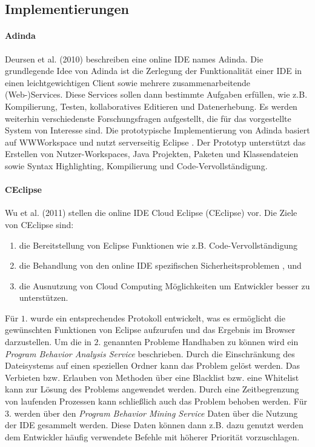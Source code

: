 \subsection{Implementierungen}\label{section:stand-der-technik:literaturrecherche:implementierungen}

\paragraph{Adinda}
Deursen et al. (2010) \cite{van_deursen_adinda_2010} beschreiben eine online IDE names Adinda. Die grundlegende Idee von Adinda ist die Zerlegung der Funktionalität einer IDE in einen leichtgewichtigen Client sowie mehrere zusammenarbeitende (Web-)Services. Diese Services sollen dann bestimmte Aufgaben erfüllen, wie z.B. Kompilierung, Testen, kollaboratives Editieren und Datenerhebung. Es werden weiterhin verschiedenste Forschungsfragen aufgestellt, die für das vorgestellte System von Interesse sind. Die prototypische Implementierung von Adinda basiert auf WWWorkspace \cite{ryan_web_2007} und nutzt serverseitig Eclipse \cite{noauthor_eclipse_nodate}. Der Prototyp unterstützt das Erstellen von Nutzer-Workspaces, Java Projekten, Paketen und Klassendateien sowie Syntax Highlighting, Kompilierung und Code-Vervollständigung. 

\paragraph{CEclipse}
Wu et al. (2011) \cite{wu_ceclipse_2011} stellen die online IDE Cloud Eclipse (CEclipse) vor. Die Ziele von CEclipse sind:
\begin{enumerate}
    \item die Bereitstellung von Eclipse \cite{noauthor_eclipse_nodate} Funktionen wie z.B. Code-Vervollständigung
    \item die Behandlung von den online IDE spezifischen Sicherheitsproblemen ,  und 
    \item die Ausnutzung von Cloud Computing Möglichkeiten um Entwickler besser zu unterstützen.
\end{enumerate}
Für $1.$ wurde ein entsprechendes Protokoll entwickelt, was es ermöglicht die gewünschten Funktionen von Eclipse aufzurufen und das Ergebnis im Browser darzustellen. Um die in $2.$ genannten Probleme Handhaben zu können wird ein \textit{Program Behavior Analysis Service} beschrieben. Durch die Einschränkung des Dateisystems auf einen speziellen Ordner kann das Problem  gelöst werden. Das Verbieten bzw. Erlauben von Methoden über eine Blacklist bzw. eine Whitelist kann zur Lösung des Problems  angewendet werden. Durch eine Zeitbegrenzung von laufenden Prozessen kann schließlich auch das Problem  behoben werden. Für $3.$ werden über den \textit{Program Behavior Mining Service} Daten über die Nutzung der IDE gesammelt werden. Diese Daten können dann z.B. dazu genutzt werden dem Entwickler häufig verwendete Befehle mit höherer Priorität vorzuschlagen. 

